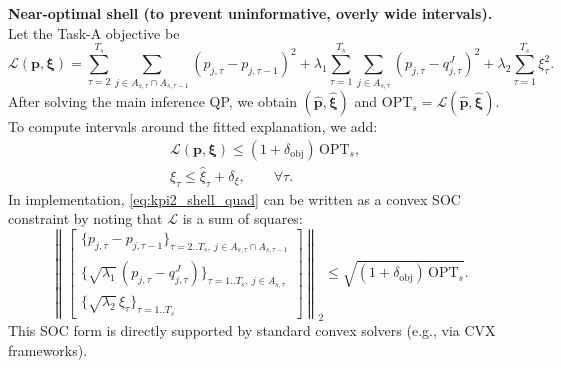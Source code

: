 \textbf{Near-optimal shell (to prevent uninformative, overly wide intervals).}
Let the Task-A objective be
\begin{equation}
\mathcal{L}(\mathbf{p},\boldsymbol{\xi})
=
\sum_{\tau=2}^{T_s}\sum_{j\in A_{s,\tau}\cap A_{s,\tau-1}}(p_{j,\tau}-p_{j,\tau-1})^2
+\lambda_1\sum_{\tau=1}^{T_s}\sum_{j\in A_{s,\tau}}(p_{j,\tau}-q^J_{j,\tau})^2
+\lambda_2\sum_{\tau=1}^{T_s}\xi_\tau^2.
\label{eq:kpi2_L_def}
\end{equation}
After solving the main inference QP, we obtain $(\hat{\mathbf{p}},\hat{\boldsymbol{\xi}})$ and $\mathrm{OPT}_s=\mathcal{L}(\hat{\mathbf{p}},\hat{\boldsymbol{\xi}})$.
To compute intervals around the fitted explanation, we add:
\begin{align}
& \mathcal{L}(\mathbf{p},\boldsymbol{\xi}) \le (1+\delta_{\mathrm{obj}})\,\mathrm{OPT}_s, \label{eq:kpi2_shell_quad}\\
& \xi_\tau \le \hat{\xi}_\tau+\delta_\xi,\qquad \forall \tau. \label{eq:kpi2_slack_cap}
\end{align}
In implementation, \eqref{eq:kpi2_shell_quad} can be written as a convex SOC constraint by noting that $\mathcal{L}$ is a sum of squares:
\[
\left\|
\begin{bmatrix}
\{p_{j,\tau}-p_{j,\tau-1}\}_{\tau=2..T_s,\ j\in A_{s,\tau}\cap A_{s,\tau-1}}\\[2pt]
\{\sqrt{\lambda_1}\,(p_{j,\tau}-q^J_{j,\tau})\}_{\tau=1..T_s,\ j\in A_{s,\tau}}\\[2pt]
\{\sqrt{\lambda_2}\,\xi_\tau\}_{\tau=1..T_s}
\end{bmatrix}
\right\|_2
\le
\sqrt{(1+\delta_{\mathrm{obj}})\,\mathrm{OPT}_s}.
\]
This SOC form is directly supported by standard convex solvers (e.g., via CVX frameworks).\cite{boyd2011admm}

